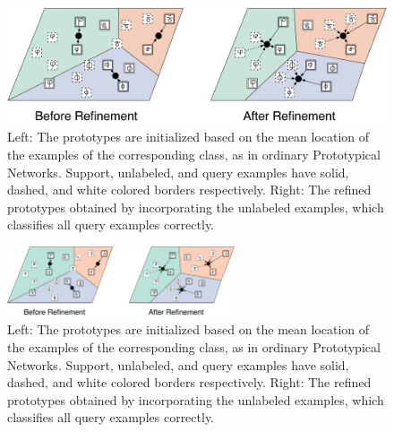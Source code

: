 \iflatexml
\begin{figure}
    \centering
    \includegraphics[width=6\textwidth]{figures/refinement_v4c.png}
    \caption{Left: The prototypes are initialized based on the mean location of the examples of the corresponding class, as in ordinary Prototypical Networks. Support, unlabeled, and query examples have solid, dashed, and white colored borders respectively. Right: The refined prototypes obtained by incorporating the unlabeled examples, which classifies all query examples correctly.}
    \label{fig:refinement}
\end{figure}
\else
\begin{figure}
    \centering
    \vspace{-0.1in}
    \includegraphics[width=0.6\textwidth]{figures/refinement_v4c.pdf}
    \caption{Left: The prototypes are initialized based on the mean location of the examples of the corresponding class, as in ordinary Prototypical Networks. Support, unlabeled, and query examples have solid, dashed, and white colored borders respectively. Right: The refined prototypes obtained by incorporating the unlabeled examples, which classifies all query examples correctly.}
    \label{fig:refinement}
    \vspace{-15pt}
\end{figure}
\fi